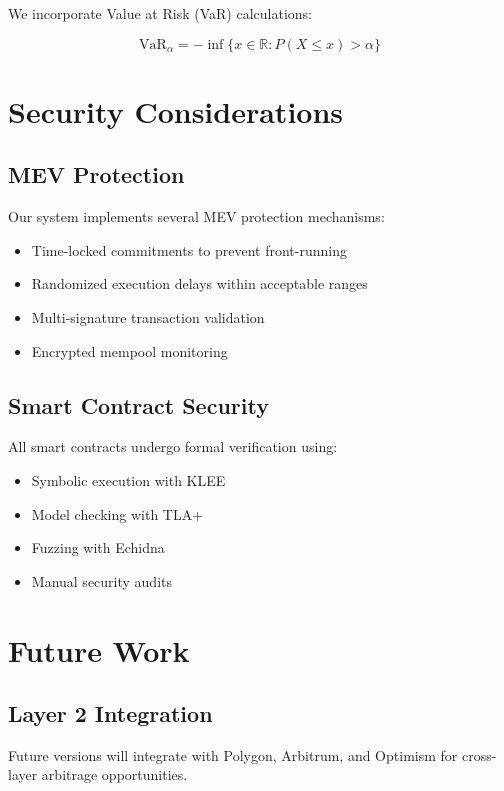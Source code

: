 \documentclass[12pt]{article}
\begin{document}
We incorporate Value at Risk (VaR) calculations:

\begin{equation}
\text{VaR}_\alpha = -\inf\{x \in \mathbb{R} : P(X \leq x) > \alpha\}
\end{equation}

\section{Security Considerations}

\subsection{MEV Protection}

Our system implements several MEV protection mechanisms:

\begin{itemize}
    \item Time-locked commitments to prevent front-running
    \item Randomized execution delays within acceptable ranges
    \item Multi-signature transaction validation
    \item Encrypted mempool monitoring
\end{itemize}

\subsection{Smart Contract Security}

All smart contracts undergo formal verification using:
\begin{itemize}
    \item Symbolic execution with KLEE
    \item Model checking with TLA+
    \item Fuzzing with Echidna
    \item Manual security audits
\end{itemize}

\section{Future Work}

\subsection{Layer 2 Integration}
Future versions will integrate with Polygon, Arbitrum, and Optimism for cross-layer arbitrage opportunities.
\end{document}
